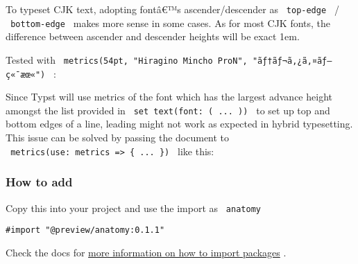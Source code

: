 To typeset CJK text, adopting fontâ€™s ascender/descender as
\texttt{\ top-edge\ } / \texttt{\ bottom-edge\ } makes more sense in
some cases. As for most CJK fonts, the difference between ascender and
descender heights will be exact 1em.

Tested with
\texttt{\ metrics(54pt,\ "Hiragino\ Mincho\ ProN",\ "ãƒ†ãƒ¬ã‚¿ã‚¤ãƒ—ç«¯æœ«")\ }
:

\pandocbounded{}

Since Typst will use metrics of the font which has the largest advance
height amongst the list provided in
\texttt{\ set\ text(font:\ (\ ...\ ))\ } to set up top and bottom edges
of a line, leading might not work as expected in hybrid typesetting.
This issue can be solved by passing the document to
\texttt{\ metrics(use:\ metrics\ =\textgreater{}\ \{\ ...\ \})\ } like
this:

\begin{Shaded}
\begin{Highlighting}[]
\NormalTok{    )}

\NormalTok{  \}}
\NormalTok{)}
\end{Highlighting}
\end{Shaded}

\subsubsection{How to add}\label{how-to-add}

Copy this into your project and use the import as \texttt{\ anatomy\ }

\begin{verbatim}
#import "@preview/anatomy:0.1.1"
\end{verbatim}



Check the docs for
\href{https://typst.app/docs/reference/scripting/\#packages}{more
information on how to import packages} .

